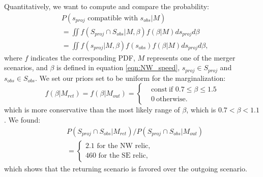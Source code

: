 Quantitatively, we want to compute and compare the probability:  
\begin{align} 
	&P(s_{proj} \text{ compatible with }s_{obs} | M)  \label{eqn:prob}\\
	&=\iint f(S_{proj} \cap S_{obs} | M, \beta) f(\beta | M) d s_{proj} d\beta\\
	&=\iint  f(s_{proj}|M, \beta) f(s_{obs}) f(\beta | M) d s_{proj}
	d\beta, 
\end{align}
where $f$ indicates the corresponding PDF, $M$
represents one of the merger scenarios, and $\beta$ is defined in equation
\ref{eqn:NW_speed}, $s_{proj} \in S_{proj}$ and $s_{obs} \in S_{obs}$. 
We set our priors set to be uniform for the marginalization: 
\begin{equation}
	f(\beta | M_{ret}) = f(\beta | M_{out}) =  
	\begin{cases}
		& \text{const}~\text{if } 0.7 \leq \beta \leq 1.5 \\
		& 0~\text{otherwise}.
	\end{cases}
\end{equation}
which is more conservative than the most likely range of $\beta$, which is
$0.7 < \beta < 1.1$.
We found: 
\begin{align}
	&P(S_{proj} \cap S_{obs} | M_{ret}) / P(S_{proj} \cap S_{obs} |
	M_{out})\\
	&=
 \begin{cases}
  2.1 \text{ for the NW relic},\\
  460 \text{ for the SE relic},
 \end{cases}
\end{align}
which shows that the returning scenario is favored over the outgoing
scenario. 

